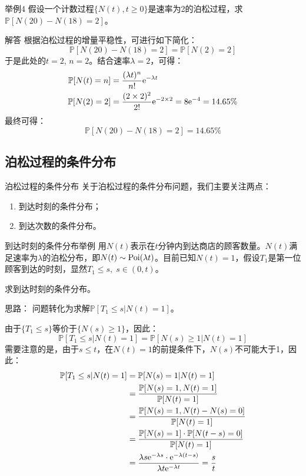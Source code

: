\documentclass[t]{beamer}
\renewcommand{\Pr}{\mathbb{P}}
\begin{document}
\begin{frame}{举例4}\small
    假设一个计数过程$\{N(t), t\ge 0\}$是速率为2的泊松过程，求$\Pr[N(20)-N(18)=2]$。

\begin{block}{解答}
    根据泊松过程的增量平稳性，可进行如下简化：
\[\Pr[N(20)-N(18)=2]=\Pr[N(2)=2]\]
于是此处的$t=2$, $n=2$。结合速率$\lambda=2$，可得：
\[\begin{split}
    \Pr[N(t)=n]&=\frac{(\lambda t)^n}{n!}{\rm e}^{-\lambda t}\\
    \Pr[N(2)=2]&=\frac{(2\times  2)^2}{2!}{\rm e}^{-2\times  2}=8{\rm e}^{-4}=14.65\% 
\end{split}
\]
最终可得：$$\Pr[N(20)-N(18)=2]=14.65\%$$
\end{block}

\end{frame}

\subsection{泊松过程的条件分布}
\begin{frame}{泊松过程的条件分布}
    关于泊松过程的条件分布问题，我们主要关注两点：
    \begin{enumerate}
        \item     到达时刻的条件分布；
        \item     到达次数的条件分布。
    \end{enumerate}
\end{frame}


\begin{frame}{到达时刻的条件分布举例}
    用$N(t)$表示在$t$分钟内到达商店的顾客数量。$N(t)$满足速率为$\lambda$的泊松分布，即$N(t)\sim {\rm Poi}(\lambda t)$。目前已知$N(t)=1$，假设$T_1$是第一位顾客到达的时刻，显然$T_1\le s,\; s\in(0,t)$。

求到达时刻的条件分布。

\begin{block}{思路：}
    问题转化为求解$\Pr[T_1\le s|N(t)=1]$。
\end{block}
\end{frame}


\begin{frame}{}
    由于$\{T_1\le s\}$等价于$\{N(s)\ge 1\}$，因此：
\[\Pr[T_1\le s|N(t)=1]=\Pr[N(s)\ge 1|N(t)=1]\]
需要注意的是，由于$s\le t$，在$N(t)=1$的前提条件下，$N(s)$不可能大于1，因此：
\[\begin{split}
\Pr[T_1\le s|N(t)=1]&=\Pr[N(s)= 1|N(t)=1]\\
&=\frac{\Pr[N(s)=1, N(t)=1]}{\Pr[N(t)=1]}\\
&=\frac{\Pr[N(s)=1, N(t)-N(s)=0]}{\Pr[N(t)=1]}\\
&=\frac{\Pr[N(s)=1]\cdot \Pr[N(t-s)=0]}{\Pr[N(t)=1]}\\
&=\frac{\lambda s{\rm e}^{-\lambda s}\cdot {\rm e}^{-\lambda(t-s)}}{\lambda t{\rm e}^{-\lambda t}}=\frac{s}{t}
\end{split}\]
\end{frame}
\end{document}
